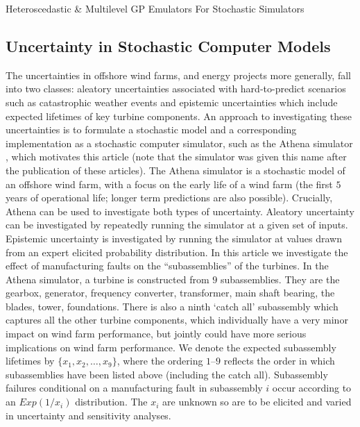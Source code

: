 \begin{chapter}{Heteroscedastic \& Multilevel GP Emulators For Stochastic Simulators\label{Ch:Hetsml}}
\subsection{Uncertainty in Stochastic Computer Models}
The uncertainties in offshore wind farms, and energy projects more generally, fall into two classes: aleatory uncertainties associated with hard-to-predict scenarios such as catastrophic weather events and epistemic uncertainties which include expected lifetimes of key turbine components. An approach to investigating these uncertainties is to formulate a stochastic model and a corresponding implementation as a stochastic computer simulator, such as the Athena simulator \citep{Zit13, Zit16}, which motivates this article (note that the simulator was given this name after the publication of these articles). The Athena simulator is a stochastic model of an offshore wind farm, with a focus on the early life of a wind farm (the first $5$ years of operational life; longer term predictions are also possible). Crucially, Athena can be used to investigate both types of uncertainty. Aleatory uncertainty can be investigated by repeatedly running the simulator at a given set of inputs. Epistemic uncertainty is investigated by running the simulator at values drawn from an expert elicited probability distribution. In this article we investigate the effect of manufacturing faults on the ``subassemblies'' of the turbines. In the Athena simulator, a turbine is constructed from $9$ subassemblies. They are the gearbox, generator, frequency converter, transformer, main shaft bearing, the blades, tower, foundations. There is also a ninth `catch all' subassembly which captures all the other turbine components, which individually have a very minor impact on wind farm performance, but jointly could have more serious implications on wind farm performance. We denote the expected subassembly lifetimes by $\{x_1, x_2, \ldots, x_9\}$, where the ordering $1$--$9$ reflects the order in which subassemblies have been listed above (including the catch all). Subassembly failures conditional on a manufacturing fault in subassembly $i$ occur according to an $Exp(1/x_i)$ distribution. The $x_i$ are unknown so are to be elicited and varied in uncertainty and sensitivity analyses.


\end{chapter}

